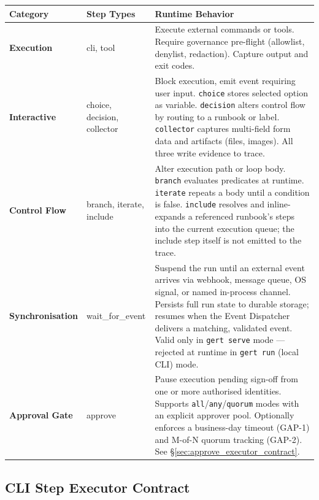 \begin{center}
\begin{tabular}{|l|l|p{7cm}|}
\hline
\textbf{Category} & \textbf{Step Types} & \textbf{Runtime Behavior} \\
\hline
\textbf{Execution} & cli, tool & Execute external commands or tools. Require governance
pre-flight (allowlist, denylist, redaction). Capture output and exit codes. \\
\hline
\textbf{Interactive} & choice, decision, collector & Block execution, emit event requiring
user input. \texttt{choice} stores selected option as variable. \texttt{decision} alters
control flow by routing to a runbook or label. \texttt{collector} captures multi-field
form data and artifacts (files, images). All three write evidence to trace. \\
\hline
\textbf{Control Flow} & branch, iterate, include & Alter execution path or loop body. \texttt{branch}
evaluates predicates at runtime. \texttt{iterate} repeats a body until a condition is false.
\texttt{include} resolves and inline-expands a referenced runbook's steps into the current
execution queue; the include step itself is not emitted to the trace. \\
\hline
\textbf{Synchronisation} & wait\_for\_event & Suspend the run until an external event arrives via
webhook, message queue, OS signal, or named in-process channel. Persists full run state to durable
storage; resumes when the Event Dispatcher delivers a matching, validated event. Valid only in
\texttt{gert serve} mode — rejected at runtime in \texttt{gert run} (local CLI) mode. \\
\hline
\textbf{Approval Gate} & approve & Pause execution pending sign-off from one or more authorised
identities. Supports \texttt{all}/\texttt{any}/\texttt{quorum} modes with an explicit approver
pool. Optionally enforces a business-day timeout (GAP-1) and M-of-N quorum tracking (GAP-2). See
§\ref{sec:approve_executor_contract}. \\
\hline
\end{tabular}
\end{center}


\subsection{CLI Step Executor Contract}
\label{sec:cli_executor_contract}

